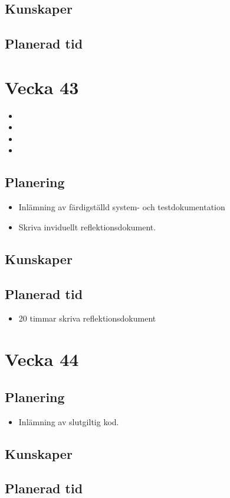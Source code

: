 \documentclass{TDP003mall}
\begin{document}
\subsection{Kunskaper}

\subsection{Planerad tid}

\section{Vecka 43}
\begin{itemize}
\item
\item
\item  
\item
\end{itemize}

\subsection{Planering}
\begin{itemize}
\item Inlämning av färdigställd system- och testdokumentation
\item Skriva inviduellt reflektionsdokument.
\end{itemize}

\subsection{Kunskaper}

\subsection{Planerad tid}
\begin{itemize}
\item 20 timmar skriva reflektionsdokument 
\end{itemize}


\section{Vecka 44}

\subsection{Planering}
\begin{itemize}
\item Inlämning av slutgiltig kod. 
\end{itemize}

\subsection{Kunskaper}

\subsection{Planerad tid}
\end{document}
